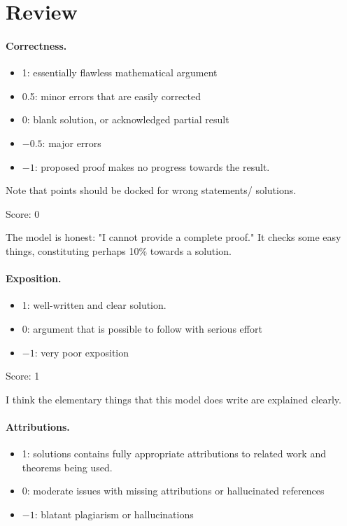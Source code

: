 \documentclass[11pt]{article}
\theoremstyle{remark}
\begin{document}
\maketitle

\section{Review}

\paragraph{Correctness.}
\begin{itemize}
	\item  1: essentially flawless mathematical argument
	\item  0.5: minor errors that are easily corrected
	\item  0: blank solution, or acknowledged partial result
	\item  $-0.5$: major errors
	\item  $-1$: proposed proof makes no progress towards the result.
\end{itemize}
Note that points should be docked for wrong statements/ solutions.

\noindent Score: 0

The model is honest: "I cannot provide a complete proof." It checks some easy things, constituting perhaps 10\% towards a solution. 

\paragraph{Exposition.}
\begin{itemize}
	\item  1: well-written and clear solution.
	\item  0: argument that is possible to follow with serious effort
	\item  $-1$: very poor exposition
\end{itemize}

\noindent Score: 1

I think the elementary things that this model does write are explained clearly. 

\paragraph{Attributions.}
\begin{itemize}
	\item  1: solutions contains fully appropriate attributions
		to related work and theorems being used.
	\item  0: moderate issues with missing attributions or hallucinated references
	\item  $-1$: blatant plagiarism or hallucinations
\end{itemize}
\end{document}
